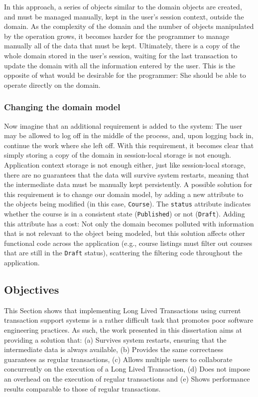 \documentclass{llncs}
\begin{document}
In this approach, a series of objects similar to the domain objects
are created, and must be managed manually, kept in the user's session
context, outside the domain. As the complexity of the domain and the
number of objects manipulated by the operation grows, it becomes
harder for the programmer to manage manually all of the data that must
be kept. Ultimately, there is a copy of the whole domain stored in the
user's session, waiting for the last transaction to update the domain
with all the information entered by the user. This is the opposite of
what would be desirable for the programmer: She should be able to
operate directly on the domain.

\subsubsection{Changing the domain model}

Now imagine that an additional requirement is added to the system: The
user may be allowed to log off in the middle of the process, and, upon
logging back in, continue the work where she left off. With this
requirement, it becomes clear that simply storing a copy of the domain
in session-local storage is not enough. Application context storage is
not enough either, just like session-local storage, there are no
guarantees that the data will survive system restarts, meaning that
the intermediate data must be manually kept persistently.  A possible
solution for this requirement is to change our domain model, by adding
a new attribute to the objects being modified (in this case,
\texttt{Course}). The \texttt{status} attribute indicates whether the
course is in a consistent state (\texttt{Published}) or not
(\texttt{Draft}). Adding this attribute has a cost: Not only the
domain becomes polluted with information that is not relevant to the
object being modeled, but this solution affects other functional code
across the application (e.g., course listings must filter out courses
that are still in the \texttt{Draft} status), scattering the filtering
code throughout the application.

\subsection{Objectives}

This Section shows that implementing Long Lived Transactions using
current transaction support systems is a rather difficult task that
promotes poor software engineering practices. As such, the work
presented in this dissertation aims at providing a solution that: (a)
Survives system restarts, ensuring that the intermediate data is
always available, (b) Provides the same correctness guarantees as
regular transactions, (c) Allows multiple users to collaborate
concurrently on the execution of a Long Lived Transaction, (d) Does
not impose an overhead on the execution of regular transactions and
(e) Shows performance results comparable to those of regular
transactions.
\end{document}

